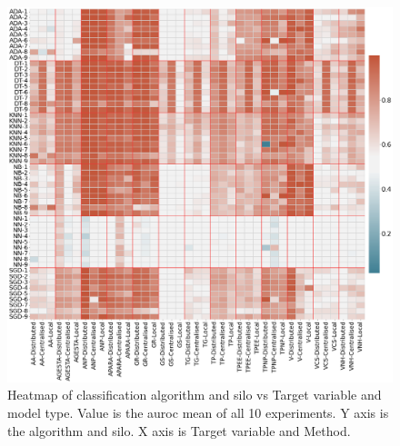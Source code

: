 



\begin{figure}[htbp]
\centering
\captionsetup{justification=centering}

\caption[Heatmap of classification algorithm and silo vs Target variable and model type.]{Heatmap of classification algorithm and silo vs Target variable and model type. Value is the \ac{auroc} mean of all 10 experiments. Y axis is the algorithm and silo. X axis is Target variable and Method.}\label{fig:heatmap-cat} 
\includegraphics[scale=0.26]{figures/heatmap-class.png}
\end{figure}

